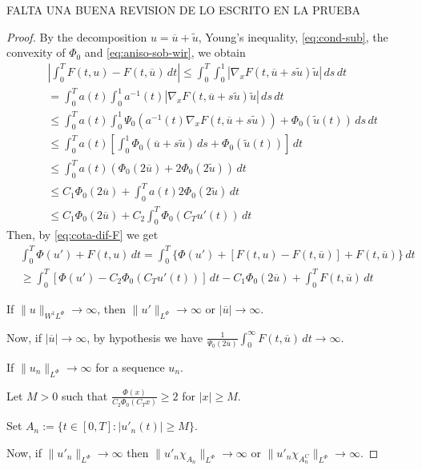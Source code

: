 \documentclass[twoside]{article}
\theoremstyle{remark}
\newcommand{\orlnor}{\|_{L^{\Phi}}}
\newcommand{\lphi}{L^{\Phi}}
\newcommand{\sobnor}{\|_{W^{1}\lphi}}
\renewcommand{\leq}{\leqslant}
\renewcommand{\geq}{\geqslant}
\begin{document}
FALTA UNA BUENA REVISION DE LO ESCRITO EN LA PRUEBA
\begin{proof}
By the decomposition $u=\overline{u}+\tilde{u}$,   Young's inequality, \eqref{eq:cond-sub}, the convexity of $\Phi_0$ 
and \eqref{eq:aniso-sob-wir}, 
we obtain
\begin{equation}\label{eq:cota-dif-F}
\begin{split}
&\left|\int_0^T F(t,u)-F(t,\overline{u})\,dt\right|
\leq \int_0^T \int_0^1 |\nabla_x F(t,\overline{u}+s\tilde{u})\tilde{u}|\,ds\,dt
\\
&=\int_0^T a(t) \int_0^1 a^{-1}(t) |\nabla_x F(t,\overline{u}+s\tilde{u})\tilde{u}|\,ds\,dt
\\
&\leq
\int_0^T a(t) \int_0^1 \Psi_0(a^{-1}(t)\nabla_xF(t,\overline{u}+s\tilde{u}))+\Phi_0(\tilde{u}(t))\,ds\,dt
\\
&\leq
\int_0^T a(t)\left[\int_0^1 \Phi_0(\overline{u}+s\tilde{u})\,ds+\Phi_0(\tilde{u}(t))\right]\,dt
\\
&\leq
\int_0^T a(t) (\Phi_0(2\overline{u})+2 \Phi_0(2\tilde{u}))\,dt
\\
&\leq C_1 \Phi_0(2\overline{u})+\int_0^T a(t)2\Phi_0(2 \tilde{u})\,dt
\\
&
\leq C_1 \Phi_0(2\overline {u}) +C_2 \int_0^T \Phi_0 (C_T u'(t))\,dt
\end{split}
\end{equation}
Then, by \eqref{eq:cota-dif-F} we get
\begin{equation}
\begin{split}
&\int_0^T  \Phi(u')+F(t,u)\,dt=
\int_0^T \{\Phi(u')+[F(t,u)-F(t,\overline{u})]+F(t,\overline{u})\}\,dt
\\
&\geq
\int_0^T [\Phi(u')-C_2 \Phi_0(C_T u'(t))]\,dt-C_1\Phi_0(2 \overline{u})+\int_0^T F(t,\overline{u})\,dt
\end{split}
\end{equation}

If $\|u\sobnor\to \infty$, then $\|u'\orlnor \to \infty$ or $|\overline{u}|\to \infty$.

Now, if $|\overline{u}|\to \infty$, by hypothesis we have
$\frac{1}{\Psi_0(2 \overline{u})}\int_0^\infty F(t,\overline{u})\,dt\to \infty$. 

If $\|u_n\orlnor \to \infty$ for a sequence $u_n$.

Let $M>0$ such that $\frac{\Phi(x)}{C_2\Phi_0(C_Tx)}\geq 2$ for $|x|\geq M$.

Set $A_n:=\{t\in [0,T]:|u'_n(t)|\geq M\}$. 

Now, if $\|u'_n\orlnor\to \infty$ then 
$\|u'_n\chi_{A_n}\orlnor\to \infty$ or $\|u'_n \chi_{A_n^C}\orlnor\to \infty$.


\end{proof}
\end{document}

